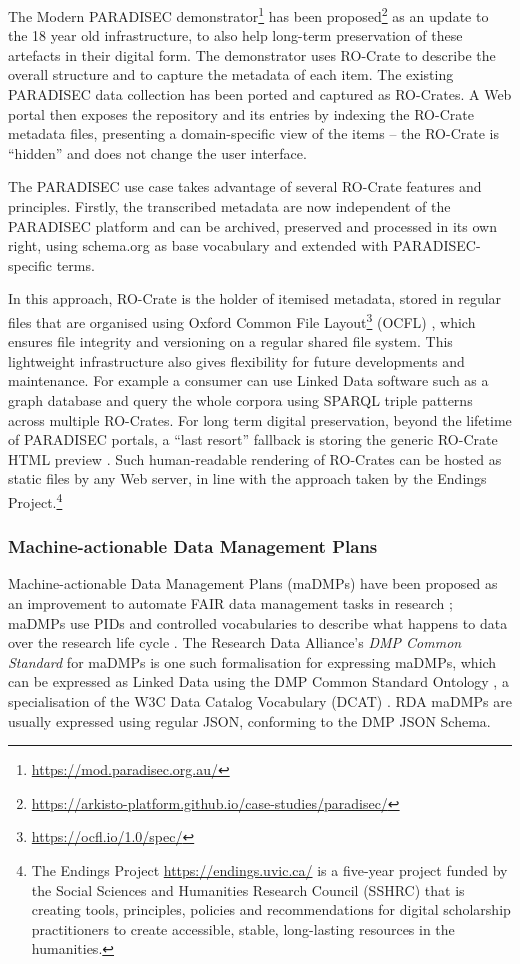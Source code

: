The Modern PARADISEC demonstrator\footnote{\url{https://mod.paradisec.org.au/}} has
been
proposed\footnote{\url{https://arkisto-platform.github.io/case-studies/paradisec/}}
as an update to the 18 year old infrastructure, to also help long-term
preservation of these artefacts in their digital form. The demonstrator
uses RO-Crate to describe the overall structure and to capture the
metadata of each item. The existing PARADISEC data collection has been
ported and captured as RO-Crates. A Web portal then exposes the
repository and its entries by indexing the RO-Crate metadata files,
presenting a domain-specific view of the items -- the RO-Crate is
``hidden'' and does not change the user interface.


The PARADISEC use case takes advantage of several RO-Crate features and
principles. Firstly, the transcribed metadata are now independent of the
PARADISEC platform and can be archived, preserved and processed in its
own right, using schema.org as base vocabulary and extended with
PARADISEC-specific terms.

In this approach, RO-Crate is the holder of itemised metadata, stored in
regular files that are organised using
Oxford Common File
Layout\footnote{\url{https://ocfl.io/1.0/spec/}} (OCFL)
\cite{ch5-96}, which ensures file integrity
and versioning on a regular shared file system. This lightweight
infrastructure also gives flexibility for future developments and
maintenance. For example a consumer can use Linked Data software such as
a graph database and query the whole corpora using SPARQL triple
patterns across multiple RO-Crates. For long term digital preservation,
beyond the lifetime of PARADISEC portals, a ``last resort'' fallback is
storing the generic RO-Crate HTML preview
\cite{ch5-95}. Such
human-readable rendering of RO-Crates can be hosted as static files by
any Web server, in line with the approach taken by the Endings
Project.\footnote{The Endings Project \url{https://endings.uvic.ca/} 
  is a five-year project funded by the Social Sciences and Humanities
  Research Council (SSHRC) that is creating tools, principles, policies
  and recommendations for digital scholarship practitioners to create
  accessible, stable, long-lasting resources in the humanities.}

\subsubsection{Machine-actionable Data Management Plans}\label{ch5:dmp}

Machine-actionable Data Management Plans (maDMPs) have been proposed as
an improvement to automate FAIR data management tasks in research
\cite{ch5-88}; maDMPs
use PIDs and controlled vocabularies to describe what happens to data
over the research life cycle
\cite{Cardoso 2020a}. The
Research Data Alliance's \emph{DMP Common Standard} for maDMPs
\cite{ch5-121} is one such
formalisation for expressing maDMPs, which can be expressed as Linked
Data using the DMP Common Standard Ontology
\cite{Cardoso 2020b}, a
specialisation of the W3C Data Catalog Vocabulary (DCAT)
\cite{DCAT2 2020}.
RDA maDMPs are usually expressed using regular JSON, conforming to the
DMP JSON Schema.

